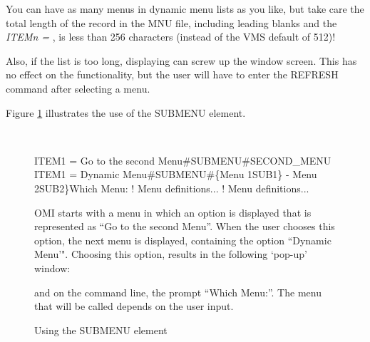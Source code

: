\documentclass[a4paper]{book}
\newcommand{\vs}{\vspace{3mm}}
\newcommand{\gt}{\texttt{>}}
\renewcommand{\indent}{\hspace*{5mm}}
\begin{document}
\vs

You can have as many menus in dynamic menu lists as you like, but take care 
the total length of the record in the MNU file, including leading blanks and 
the \textsl{ITEM\textit{n} = }, is less than 256 characters (instead of the VMS default of 
512)!

Also, if the list is too long, displaying can screw up the window screen. 
This has no effect on the functionality, but the user will have to enter the 
\textsf{REFRESH} command after selecting a menu.

Figure \ref{fig:submenu} illustrates the use of the \textsf{SUBMENU} element.

\begin{figure}[ht]
\begin{minipage}[t]{\textwidth}
\hrulefill \\
\begin{ttfamily}
 \newline
\indent ITEM1 = Go to the second Menu{\#}SUBMENU{\#}SECOND{\_}MENU \newline
  \newline
\indent ITEM1 = Dynamic Menu{\#}SUBMENU{\#}{\{}Menu 1\textbar SUB1{\}} - \newline
\indent\indent{\{}Menu 2\textbar SUB2{\}}Which Menu: \newline
  \newline
\indent ! Menu definitions... \newline
  \newline
\indent ! Menu definitions... \newline
\end{ttfamily}
\noindent OMI starts with a menu in which an option is displayed that is represented as 
``Go to the second Menu''. When the user chooses this option, the next menu is displayed, 
containing the option ``Dynamic Menu'". Choosing this option, results in the 
following `pop-up' window:

\hspace*{\fill}\fbox{\parbox{5em}{{\textbf{1\gt}} Menu 1 \newline {\textbf{2\gt}} Menu 2}}\hspace*{\fill}

\noindent and on the command line, the prompt ``Which Menu:''. The menu that will be called depends 
on the user input.\caption{Using the SUBMENU element}\label{fig:submenu}
\hrulefill
\end{minipage}
\end{figure}
\end{document}

